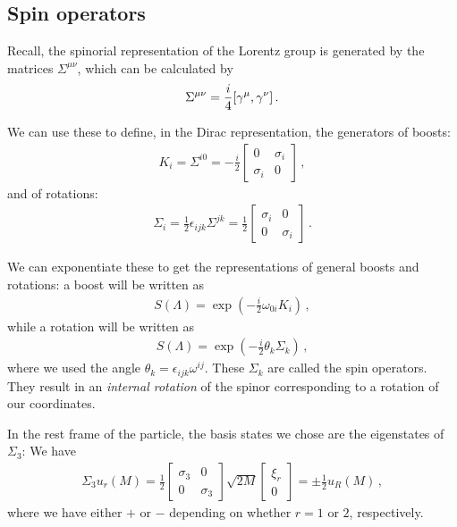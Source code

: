 \documentclass[main.tex]{subfiles}
\begin{document}
\subsection{Spin operators}

Recall, the spinorial representation of the Lorentz group is generated by the matrices \(\Sigma^{\mu \nu }\), which can be calculated by 
%
\begin{align}
\Sigma^{\mu \nu } = \frac{i}{4} \qty[\gamma^{\mu }, \gamma^{\nu }]
\,.
\end{align}

We can use these to define, in the Dirac representation, the generators of boosts: 
%
\begin{align}
K_{i} = \Sigma^{i0} = -\frac{i}{2} \left[\begin{array}{cc}
0 & \sigma_{i} \\ 
\sigma_{i} & 0
\end{array}\right]
\,,
\end{align}
%
and of rotations: 
%
\begin{align} \label{eq:rotation-spin-generator-definition}
\Sigma_{i} = \frac{1}{2} \epsilon_{ijk} \Sigma^{jk} 
= \frac{1}{2} \left[\begin{array}{cc}
\sigma_{i} & 0 \\ 
0 & \sigma_{i}
\end{array}\right]
\,.
\end{align}

We can exponentiate these to get the representations of general boosts and rotations: a boost will be written as 
%
\begin{align}
S(\Lambda) = \exp( - \frac{i}{2} \omega_{0i} K_{i} )
\,,
\end{align}
%
while a rotation will be written as 
%
\begin{align}
S(\Lambda ) = \exp( - \frac{i}{2} \theta_{k} \Sigma_{k})
\,,
\end{align}
%
where we used the angle \(\theta_{k} = \epsilon_{ijk} \omega^{ij}\).
These \(\Sigma_{k}\) are called the spin operators. They result in an \emph{internal rotation} of the spinor corresponding to a rotation of our coordinates.

In the rest frame of the particle, the basis states we chose are the eigenstates of \(\Sigma_{3}\): We have 
%
\begin{align}
\Sigma_{3} u_r (M) = \frac{1}{2} \left[\begin{array}{cc}
\sigma_3  & 0 \\ 
0 & \sigma_3 
\end{array}\right]
\sqrt{2M}
\left[\begin{array}{c}
\xi_{r} \\ 
0
\end{array}\right]
= \pm \frac{1}{2} u_R (M)
\,,
\end{align}
%
where we have either \(+\) or \(-\) depending on whether \(r=1\) or \(2\), respectively.
\end{document}

